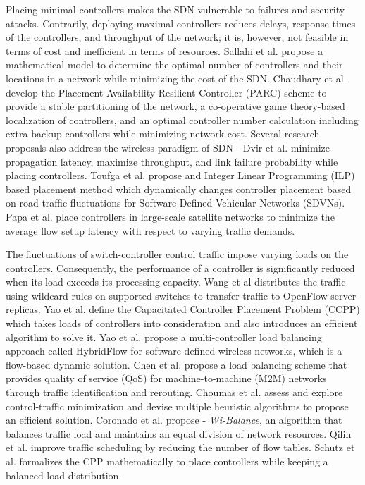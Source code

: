 \documentclass[a4paper,fleqn]{cas-dc}
\begin{document}
Placing minimal controllers makes the SDN vulnerable to failures and security attacks. Contrarily, deploying maximal controllers reduces delays, response times of the controllers, and throughput of the network; it is, however, not feasible in terms of cost and inefficient in terms of resources. Sallahi et al. \cite{sallahi2015optimal} propose a mathematical model to determine the optimal number of controllers and their locations in a network while minimizing the cost of the SDN. Chaudhary et al. \cite{chaudhary2020cost} develop the Placement Availability Resilient Controller (PARC) scheme to provide a stable partitioning of the network, a co-operative game theory-based localization of controllers, and an optimal controller number calculation including extra backup controllers while minimizing network cost. Several research proposals also address the wireless paradigm of SDN - Dvir et al. \cite{dvir2019wireless} minimize propagation latency, maximize throughput, and link failure probability while placing controllers. Toufga et al. \cite{toufga2020vehicle} propose and Integer Linear Programming (ILP) based placement method which dynamically changes controller placement based on road traffic fluctuations for Software-Defined Vehicular Networks (SDVNs). Papa et al. \cite{papa2020satellite} place controllers in large-scale satellite networks to minimize the average flow setup latency with respect to varying traffic demands.

The fluctuations of switch-controller control traffic impose varying loads on the controllers. Consequently, the performance of a controller is significantly reduced when its load exceeds its processing capacity. Wang et al \cite{wang2011load} distributes the traffic using wildcard rules on supported switches to transfer traffic to OpenFlow \cite{hu2014survey} server replicas. Yao et al. \cite{yao2014capacitated} define the Capacitated Controller Placement Problem (CCPP) which takes loads of controllers into consideration and also introduces an efficient algorithm to solve it. Yao et al. \cite{yao2015controller} propose a multi-controller load balancing approach called HybridFlow for software-defined wireless networks, which is a flow-based dynamic solution. Chen et al. \cite{chen2018load} propose a load balancing scheme that provides quality of service (QoS) for machine-to-machine (M2M) networks through traffic identification and rerouting. Choumas et al. \cite{choumas2020oittraffic} assess and explore control-traffic minimization and devise multiple heuristic algorithms to propose an efficient solution. Coronado et al. \cite{coronado2017wiload} propose - \textit{Wi-Balance}, an algorithm that balances traffic load and maintains an equal division of network resources.
Qilin et al. \cite{qilin2015load} improve traffic scheduling by reducing the number of flow tables. Schutz et al. \cite{schutz2020load} formalizes the CPP mathematically to place controllers while keeping a balanced load distribution.
\end{document}
